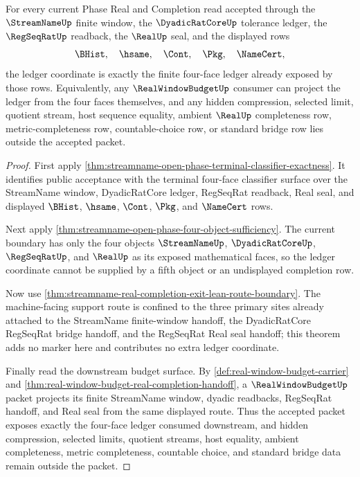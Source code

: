 \begin{theorem}
\label{thm:streamname-open-phase-four-face-ledger-exactness}
For every current Phase Real and Completion read accepted through the $\StreamNameUp$ finite window, the $\DyadicRatCoreUp$ tolerance ledger, the $\RegSeqRatUp$ readback, the $\RealUp$ seal, and the displayed rows
$$
\BHist,\quad \hsame,\quad \Cont,\quad \Pkg,\quad \NameCert,
$$
the ledger coordinate is exactly the finite four-face ledger already exposed by those rows. Equivalently, any $\RealWindowBudgetUp$ consumer can project the ledger from the four faces themselves, and any hidden compression, selected limit, quotient stream, host sequence equality, ambient $\RealUp$ completeness row, metric-completeness row, countable-choice row, or standard bridge row lies outside the accepted packet.
\end{theorem}
\begin{proof}
First apply \autoref{thm:streamname-open-phase-terminal-classifier-exactness}. It identifies public acceptance with the terminal four-face classifier surface over the StreamName window, DyadicRatCore ledger, RegSeqRat readback, Real seal, and displayed $\BHist$, $\hsame$, $\Cont$, $\Pkg$, and $\NameCert$ rows.

Next apply \autoref{thm:streamname-open-phase-four-object-sufficiency}. The current boundary has only the four objects $\StreamNameUp$, $\DyadicRatCoreUp$, $\RegSeqRatUp$, and $\RealUp$ as its exposed mathematical faces, so the ledger coordinate cannot be supplied by a fifth object or an undisplayed completion row.

Now use \autoref{thm:streamname-real-completion-exit-lean-route-boundary}. The machine-facing support route is confined to the three primary sites already attached to the StreamName finite-window handoff, the DyadicRatCore RegSeqRat bridge handoff, and the RegSeqRat Real seal handoff; this theorem adds no marker here and contributes no extra ledger coordinate.

Finally read the downstream budget surface. By \autoref{def:real-window-budget-carrier} and \autoref{thm:real-window-budget-real-completion-handoff}, a $\RealWindowBudgetUp$ packet projects its finite StreamName window, dyadic readbacks, RegSeqRat handoff, and Real seal from the same displayed route. Thus the accepted packet exposes exactly the four-face ledger consumed downstream, and hidden compression, selected limits, quotient streams, host equality, ambient completeness, metric completeness, countable choice, and standard bridge data remain outside the packet.
\end{proof}

